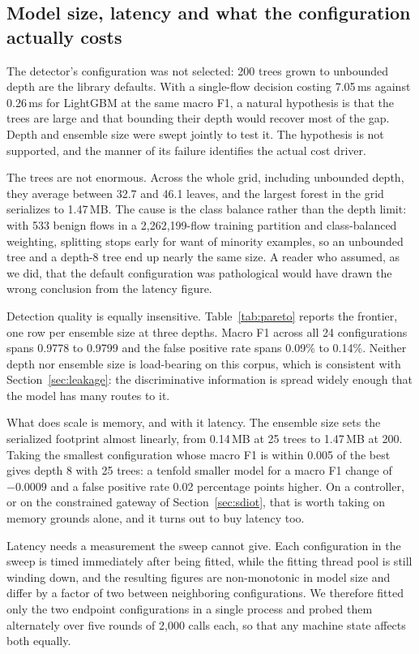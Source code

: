 \documentclass{ieeeaccess}
\begin{document}
\subsection{Model size, latency and what the configuration actually costs}
\label{sec:pareto}
The detector's configuration was not selected: 200 trees grown to unbounded
depth are the library defaults. With a
single-flow decision costing 7.05\,ms against 0.26\,ms for LightGBM at the same
macro F1, a natural hypothesis is that the trees are large and that bounding their depth
would recover most of the gap. Depth and ensemble size were swept jointly to
test it. The hypothesis is not supported, and the manner of its failure
identifies the actual cost driver.

The trees are not enormous. Across the whole grid, including unbounded depth,
they average between 32.7 and 46.1 leaves, and the largest forest in the grid
serializes to 1.47\,MB. The cause is the class balance rather than the depth
limit: with 533
benign flows in a 2,262,199-flow training partition and class-balanced weighting,
splitting stops early for want of minority examples, so an unbounded tree and a
depth-8 tree end up nearly the same size. A reader who assumed, as we did, that
the default configuration was pathological would have drawn the wrong conclusion
from the latency figure.

Detection quality is equally insensitive. Table~\ref{tab:pareto} reports the
frontier, one row per ensemble size at three depths. Macro F1 across all 24
configurations spans 0.9778 to 0.9799 and the false positive rate spans 0.09\% to 0.14\%.
Neither depth nor ensemble size is load-bearing on this corpus, which is
consistent with Section~\ref{sec:leakage}: the discriminative information is
spread widely enough that the model has many routes to it.

What does scale is memory, and with it latency. The ensemble size sets the
serialized footprint almost linearly, from 0.14\,MB at 25 trees to 1.47\,MB at
200. Taking the smallest configuration whose macro F1 is within 0.005 of the best
gives depth 8 with 25 trees: a tenfold smaller model for a macro F1 change of
$-0.0009$ and a false positive rate 0.02 percentage points higher. On a
controller, or on the constrained gateway of Section~\ref{sec:sdiot}, that is
worth taking on memory grounds alone, and it turns out to buy latency too.

Latency needs a measurement the sweep cannot give. Each configuration in the
sweep is timed immediately after being fitted, while the fitting thread pool is
still winding down, and the resulting figures are non-monotonic in model size and
differ by a factor of two between neighboring configurations. We therefore fitted
only the two endpoint configurations in a single process and probed them
alternately over five rounds of 2,000 calls each, so that any machine state
affects both equally.
\end{document}
